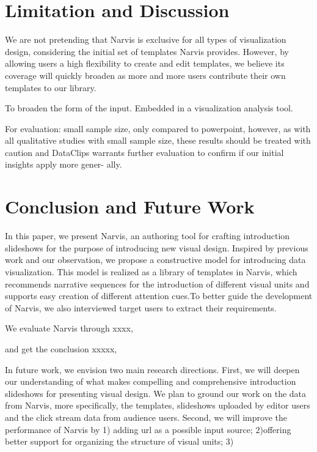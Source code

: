 \section{Limitation and Discussion}
We are not pretending that Narvis is exclusive for all types of visualization design, considering the initial set of templates Narvis provides. However, by allowing users a high flexibility to create and edit templates, we believe its coverage  will quickly broaden as more and more users contribute their own templates to our library. 

To broaden the form of the input. Embedded in a visualization analysis tool. 

For evaluation: small sample size, only compared to powerpoint,
however, as with all qualitative studies with small sample size, these results should be treated with caution and DataClips warrants further evaluation to confirm if our initial insights apply more gener- ally. 

\section{Conclusion and Future Work}
In this paper, we present Narvis, an authoring tool for crafting introduction slideshows for the purpose of introducing new visual design. 
Inspired by previous work and our observation, we propose a constructive model for introducing data visualization. This model is realized as a library of templates in Narvis, which recommends narrative sequences for the introduction of different visual units and supports easy creation of different attention cues.To better guide the development of Narvis, we also interviewed target users to extract their requirements. 

We evaluate Narvis through xxxx,

and get the conclusion xxxxx,

In future work, we envision two main research directions. First, we will deepen our understanding of what makes compelling and comprehensive introduction slideshows for presenting visual design. We plan to ground our work on the data from Narvis, more specifically, the templates, slideshows uploaded by editor users and the click stream data from audience users. Second, we will improve the performance of Narvis by 1) adding url as a possible input source; 2)offering better support for organizing the structure of visual units; 3)

